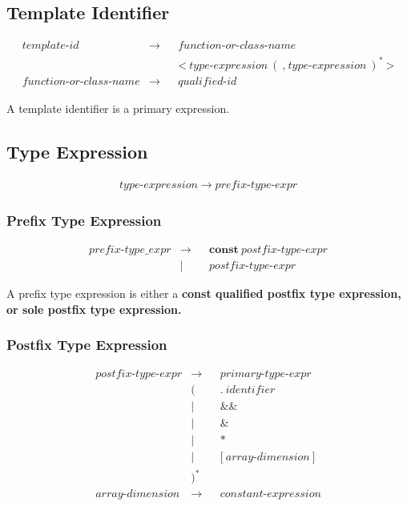 \documentclass[a4paper,oneside,11pt]{article}
\begin{document}
\subsection{Template Identifier}\label{templateid}

\begin{align*}
template\textrm{-}id &\rightarrow & &function\textrm{-}or\textrm{-}class\textrm{-}name\\
& & &\texttt{<} \> \hyperref[typeexpr]{type\textrm{-}expression} \> ( \> \texttt{,} \> \hyperref[typeexpr]{type\textrm{-}expression} \> )^* \> \texttt{>}\\
function\textrm{-}or\textrm{-}class\textrm{-}name &\rightarrow & &\hyperref[qualifiedid]{qualified\textrm{-}id}
\end{align*}

A template identifier is a primary expression.

\subsection{Type Expression}\label{typeexpr}

\begin{align*}
type\textrm{-}expression \rightarrow \hyperref[prefixtypeexpr]{prefix\textrm{-}type\textrm{-}expr}
\end{align*}

\subsubsection{Prefix Type Expression}\label{prefixtypeexpr}

\begin{align*}
prefix\textrm{-}type\_expr &\rightarrow & &\textbf{const} \> \hyperref[postfixtypeexpr]{postfix\textrm{-}type\textrm{-}expr}\\
&| & &\hyperref[postfixtypeexpr]{postfix\textrm{-}type\textrm{-}expr}
\end{align*}

A prefix type expression is either a \bf{const} qualified postfix type expression,
or sole postfix type expression.

\subsubsection{Postfix Type Expression}\label{postfixtypeexpr}

\begin{align*}
postfix\textrm{-}type\textrm{-}expr &\rightarrow & &\hyperref[primarytypeexpr]{primary\textrm{-}type\textrm{-}expr}\\
&( & &\texttt{.} \> \hyperref[identifier]{identifier}\\
&| & &\texttt{\&\&}\\
&| & &\texttt{\&}\\
&| & &\texttt{*}\\
&| & &\texttt{[} \> array\textrm{-}dimension \> \texttt{]}\\
&)^*\\
array\textrm{-}dimension &\rightarrow & &\hyperref[constantexpr]{constant\textrm{-}expression}
\end{align*}
\end{document}
